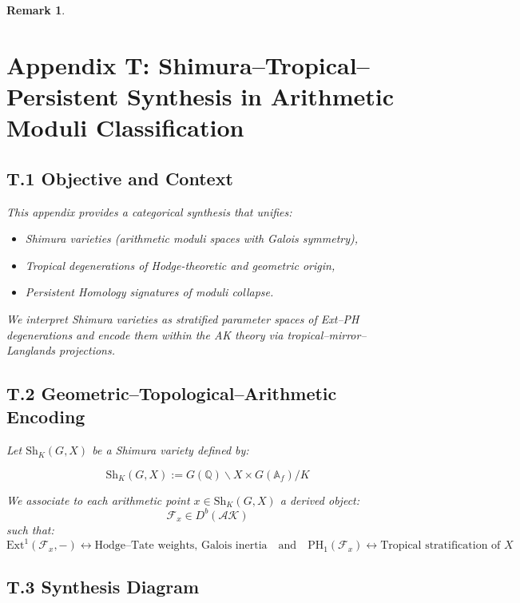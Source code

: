 \documentclass[11pt]{article}
\newtheorem{remark}[theorem]{Remark}
\begin{document}
\begin{remark}

\section*{Appendix T: Shimura–Tropical–Persistent Synthesis in Arithmetic Moduli Classification}

\subsection*{T.1 Objective and Context}

This appendix provides a categorical synthesis that unifies:

\begin{itemize}
  \item Shimura varieties (arithmetic moduli spaces with Galois symmetry),
  \item Tropical degenerations of Hodge-theoretic and geometric origin,
  \item Persistent Homology signatures of moduli collapse.
\end{itemize}

We interpret Shimura varieties as stratified parameter spaces of Ext–PH degenerations  
and encode them within the AK theory via tropical–mirror–Langlands projections.

\subsection*{T.2 Geometric–Topological–Arithmetic Encoding}

Let \( \mathrm{Sh}_K(G,X) \) be a Shimura variety defined by:

\[
\mathrm{Sh}_K(G,X) := G(\mathbb{Q}) \backslash X \times G(\mathbb{A}_f) / K
\]

We associate to each arithmetic point \( x \in \mathrm{Sh}_K(G,X) \) a derived object:
\[
\mathcal{F}_x \in D^b(\mathcal{AK})
\]
such that:
\[
\mathrm{Ext}^1(\mathcal{F}_x, -) \longleftrightarrow \text{Hodge–Tate weights, Galois inertia}
\quad \text{and} \quad
\mathrm{PH}_1(\mathcal{F}_x) \longleftrightarrow \text{Tropical stratification of } X
\]

\subsection*{T.3 Synthesis Diagram}


\end{remark}
\end{document}
